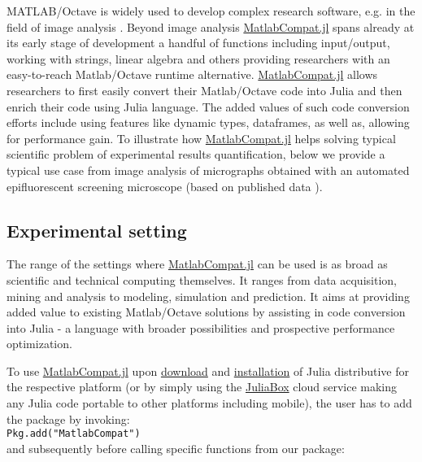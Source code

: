 MATLAB/Octave is widely used to develop complex research software, e.g. in the field of image analysis \cite{Kiss_2014, 17076895}. Beyond image analysis \href{https://github.com/MatlabCompat/MatlabCompat.jl}{MatlabCompat.jl} spans already at its early stage of development a handful of functions including input/output, working with strings, linear algebra and others providing researchers with an easy-to-reach Matlab/Octave runtime alternative. \href{https://github.com/MatlabCompat/MatlabCompat.jl}{MatlabCompat.jl} allows researchers to first easily convert their Matlab/Octave code into Julia and then enrich their code using Julia language. The added values of such code conversion efforts include using features like dynamic types, dataframes, as well as, allowing for performance gain. To illustrate how \href{https://github.com/MatlabCompat/MatlabCompat.jl}{MatlabCompat.jl} helps solving typical scientific problem of experimental results quantification, below we provide a typical use case from image analysis of micrographs obtained with an automated epifluorescent screening microscope (based on published data \cite{22787215}).

\subsection{Experimental setting}

The range of the settings where \href{https://github.com/MatlabCompat/MatlabCompat.jl}{MatlabCompat.jl} can be used is as broad as scientific and technical computing themselves. It ranges from data acquisition, mining and analysis to modeling, simulation and prediction. It aims at providing added value to existing Matlab/Octave solutions by assisting in code conversion into Julia - a language with broader possibilities and prospective performance optimization.

To use \href{https://github.com/MatlabCompat/MatlabCompat.jl}{MatlabCompat.jl} upon \href{http://julialang.org/downloads/}{download} and \href{http://docs.julialang.org/en/release-0.3/manual/getting-started/}{installation} of Julia distributive for the respective platform (or by simply using the \href{https://www.juliabox.org/}{JuliaBox} cloud service making any Julia code portable to other platforms including mobile), the user has to add the package by invoking:\\

\verb|Pkg.add("MatlabCompat")|\\

and subsequently before calling specific functions from our package:\\

